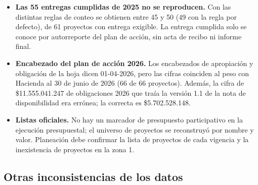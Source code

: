 \documentclass[11pt,letterpaper]{article}
\begin{document}
\begin{itemize}
\item \textbf{Las 55 entregas cumplidas de 2025 no se reproducen.} Con las distintas reglas de conteo se obtienen entre 45 y 50 (49 con la regla por defecto), de 61 proyectos con entrega exigible. La entrega cumplida solo se conoce por autorreporte del plan de acción, sin acta de recibo ni informe final.

\item \textbf{Encabezado del plan de acción 2026.} Los encabezados de apropiación y obligación de la hoja dicen \guillemotleft{}01-04-2026\guillemotright{}, pero las cifras coinciden al peso con Hacienda al 30 de junio de 2026 (66 de 66 proyectos). Además, la cifra de \$11.555.041.247 de obligaciones 2026 que traía la versión 1.1 de la nota de disponibilidad era errónea; la correcta es \$5.702.528.148.

\item \textbf{Listas oficiales.} No hay un marcador de presupuesto participativo en la ejecución presupuestal; el universo de proyectos se reconstruyó por nombre y valor. Planeación debe confirmar la lista de proyectos de cada vigencia y la inexistencia de proyectos en la zona 1.

\end{itemize}

\subsection{Otras inconsistencias de los datos}
\end{document}
